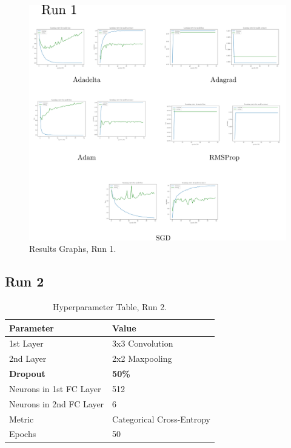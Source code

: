 \documentclass[report, 11pt, oneside]{dissertation}
\begin{document}
\begin{figure}[H]
   \centering
	\includegraphics[scale=0.20]{figure_31.pdf}
	\caption{Results Graphs, Run 1.}
	\label{fig:results_graphs_1}
\end{figure}
	
\subsection{Run 2}

\begin{table}[H]
\centering
	\begin{tabular}{|l|l|}
		\hline
		Parameter               & Value                     \\ \hline
		1st Layer               & 3x3 Convolution           \\ \hline
		2nd Layer               & 2x2 Maxpooling            \\ \hline
		\textbf{Dropout}        & \textbf{50\%}             \\ \hline
		Neurons in 1st FC Layer & 512                       \\ \hline
		Neurons in 2nd FC Layer & 6                         \\ \hline
		Metric                  & Categorical Cross-Entropy \\ \hline
		Epochs                  & 50                        \\ \hline
		\end{tabular}
	\caption{Hyperparameter Table, Run 2.}
	\label{tab:parameters_2}
\end{table}
\end{document}
